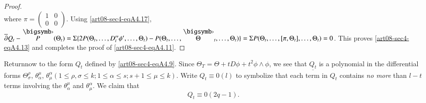 \begin{proof}
\begin{equation*}
\end{equation*}
where $\pi=\left(\begin{smallmatrix} 1 & 0\\ 0 & 0\end{smallmatrix}\right)$. Using \eqref{art08-sec4-eqA4.17}, $\overline{\partial}Q_{t}-\overdot{P}(\Theta_{t})=\Sigma\{2P(\Theta_{t},\ldots,D''_{t}\phi',\break \ldots,\Theta_{t})-P(\Theta_{t},\ldots,\overdot{\Theta}_{t},\ldots,\Theta_{t})\}=\Sigma P(\Theta_{t},\ldots,[\pi,\Theta_{t}],\ldots,\Theta_{t})=0$. This proves \eqref{art08-sec4-eqA4.13} and completes the proof of \eqref{art08-sec4-eqA4.11}.
\end{proof}

Return\pageoriginale now to the form $Q_{t}$ defined by \eqref{art08-sec4-eqA4.9}. Since $\Theta_{T}=\Theta+tD\phi+t^{2}\phi\wedge \phi$, we see that $\underline{Q_{t}}$ is a polynomial in the differential forms $\Theta^{\rho}_{\sigma}$, $\theta^{\mu}_{\alpha}$, $\theta^{\alpha}_{\mu}(1\leq \rho, \sigma\leq k; 1\leq \alpha\leq s;s+1\leq \mu\leq k)$. Write $Q_{t}\equiv 0(l)$ to symbolize that each term in $Q_{t}$ contains {\em no more} than $l-t$ terms involving the $\theta^{\mu}_{\alpha}$ and $\theta^{\alpha}_{\mu}$. We claim that
\begin{equation*}
Q_{t}\equiv 0(2q-1).\tag{A4.18}\label{art08-sec4-eqA4.18}
\end{equation*}

